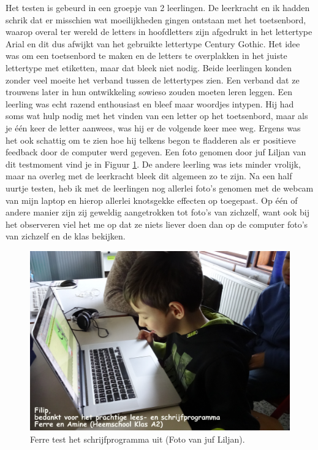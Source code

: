 \documentclass[a4paper,11pt]{article}
\theoremstyle{definition}
\begin{document}
\begin{itemize}
\begin{itemize}
 \noindent Het testen is gebeurd in een groepje van 2 leerlingen. 
 De leerkracht en ik hadden schrik dat er misschien wat moeilijkheden gingen ontstaan met het toetsenbord,
 waarop overal ter wereld de letters in hoofdletters zijn afgedrukt in het lettertype Arial en dit dus afwijkt van het gebruikte lettertype Century Gothic.
 Het idee was om een toetsenbord te maken en de letters te overplakken in het juiste lettertype met etiketten, maar dat bleek niet nodig. Beide leerlingen
 konden zonder veel moeite het verband tussen de lettertypes zien. Een verband dat ze trouwens later in hun ontwikkeling sowieso zouden moeten leren leggen.
    Een leerling 
 was echt razend enthousiast en bleef maar woordjes intypen. Hij had soms wat hulp nodig met het vinden van een letter op het toetsenbord, maar als je één keer de letter aanwees, was hij er de volgende keer mee weg. Ergens was het ook schattig om te zien hoe hij telkens begon te fladderen
 als er positieve feedback door de computer werd gegeven. Een foto genomen door juf Liljan van dit testmoment vind je in Figuur \ref{ferre}. De andere leerling 
 was iets minder vrolijk, maar na overleg met de leerkracht bleek dit algemeen zo te zijn. 
 Na een half uurtje testen, heb ik met de leerlingen nog allerlei foto's genomen 
 met de webcam van mijn laptop
 en hierop allerlei knotsgekke effecten op toegepast. Op één of andere manier 
 zijn zij geweldig aangetrokken tot foto's van zichzelf, want ook bij het 
 observeren viel het me op dat ze niets liever doen dan op de computer foto's van zichzelf en de 
 klas bekijken.

 \begin{figure}[h!]
  \centering
  \includegraphics[scale=0.075]{ferre.jpg}\caption{Ferre test het schrijfprogramma uit (Foto van juf Liljan).}\label{ferre}
\end{figure}


\end{itemize}
\end{itemize}
\end{document}
